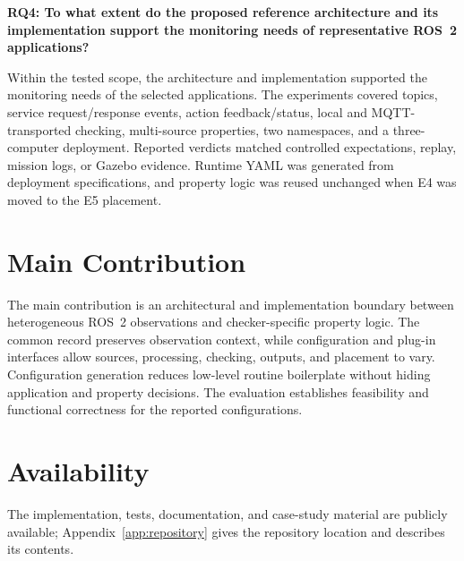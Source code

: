 \textbf{RQ4: To what extent do the proposed reference architecture and its
implementation support the monitoring needs of representative ROS~2
applications?}

Within the tested scope, the architecture and implementation supported the
monitoring needs of the selected applications. The experiments covered
topics, service request/response events, action feedback/status, local and
MQTT-transported checking, multi-source properties, two namespaces, and a
three-computer deployment. Reported verdicts matched controlled expectations,
replay, mission logs, or Gazebo evidence. Runtime YAML was generated from
deployment specifications, and property logic was reused unchanged when E4 was
moved to the E5 placement.

\section{Main Contribution}

The main contribution is an architectural and implementation boundary
between heterogeneous ROS~2 observations and checker-specific property logic.
The common record preserves observation context, while configuration and
plug-in interfaces allow sources, processing, checking, outputs, and placement
to vary. Configuration generation reduces low-level routine boilerplate without
hiding application and property decisions. The evaluation establishes feasibility 
and functional correctness for the reported configurations.

\section{Availability}

The implementation, tests, documentation, and case-study material are publicly
available; Appendix~\ref{app:repository} gives the repository location and
describes its contents.
